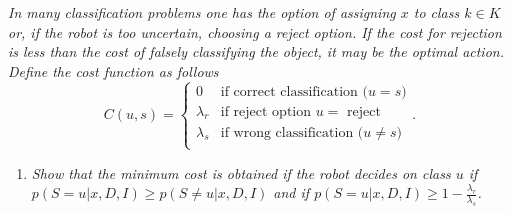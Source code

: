 \begin{example}
	\emph{In many classification problems one has the option of assigning $x$ to class $k\in K$ or, if the robot is too uncertain, choosing a reject option. If the cost for rejection is less than the cost of falsely classifying the object, it may be the optimal action. Define the cost function as follows}
	\begin{equation}
		C(u,s)=\begin{cases}
			0 & \text{if correct classification ($u=s$)}\\
			\lambda_r & \text{if reject option $u=$ reject}\\
			\lambda_s & \text{if wrong classification ($u\neq s$)}\\
		\end{cases}.
	\end{equation}
	
	\begin{enumerate}
		\item \emph{Show that the minimum cost is obtained if the robot decides on class $u$ if $p(S=u|x,D,I)\geq p(S\neq u|x,D,I)$ and if $p(S=u|x,D,I)\geq 1-\frac{\lambda_r}{\lambda_s}$.}\newline
		

\end{enumerate}
\end{example}
